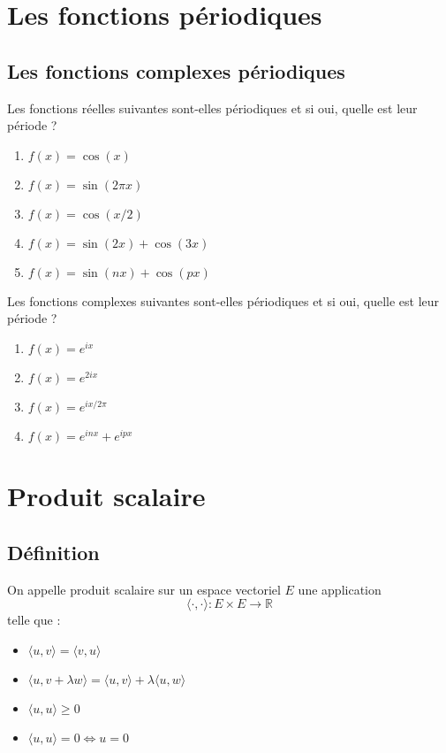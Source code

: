 \section{Les fonctions périodiques}

\subsection{Les fonctions complexes périodiques}

Les fonctions réelles suivantes sont-elles périodiques et si oui, quelle est leur période ?

\begin{enumerate}
    \item $f(x) = \cos(x)$
    \item $f(x) = \sin(2\pi x)$
    \item $f(x) = \cos(x/2)$
    \item $f(x) = \sin(2x) + \cos(3x)$
    \item $f(x) = \sin(nx) + \cos(px)$
\end{enumerate}
Les fonctions complexes suivantes sont-elles périodiques et si oui, quelle est leur période ?

\begin{enumerate}
    \item $f(x) = e^{ix}$
    \item $f(x) = e^{2ix}$
    \item $f(x) = e^{ix/2\pi}$
    \item $f(x) = e^{inx} + e^{ipx}$
\end{enumerate}


\section{Produit scalaire}

\subsection{Définition}
On appelle produit scalaire sur un espace vectoriel $E$ une application 
$$\langle \cdot, \cdot \rangle : E \times E \to \mathbb{R}$$
telle que :
\begin{itemize}
    \item $\langle u, v \rangle = \langle v, u \rangle$
    \item $\langle u, v + \lambda w \rangle = \langle u, v \rangle + \lambda \langle u, w \rangle$
    \item $\langle u, u \rangle \geq 0$
    \item $\langle u, u \rangle = 0 \iff u = 0$
\end{itemize}



